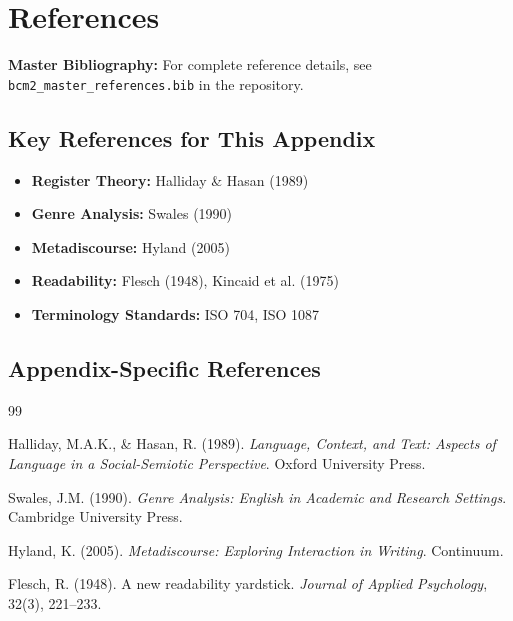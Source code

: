 \section{References}
\label{sec:doctype-references}

\begin{tcolorbox}[colback=blue!5!white, colframe=blue!75!black]
\textbf{Master Bibliography:} For complete reference details, see
\texttt{bcm2\_master\_references.bib} in the repository.
\end{tcolorbox}

\subsection{Key References for This Appendix}

\begin{itemize}[nosep]
    \item \textbf{Register Theory:} Halliday \& Hasan (1989)
    \item \textbf{Genre Analysis:} Swales (1990)
    \item \textbf{Metadiscourse:} Hyland (2005)
    \item \textbf{Readability:} Flesch (1948), Kincaid et al. (1975)
    \item \textbf{Terminology Standards:} ISO 704, ISO 1087
\end{itemize}

\subsection{Appendix-Specific References}

\begin{thebibliography}{99}

 Halliday, M.A.K., \& Hasan, R. (1989).
\textit{Language, Context, and Text: Aspects of Language in a Social-Semiotic Perspective}.
Oxford University Press.

 Swales, J.M. (1990).
\textit{Genre Analysis: English in Academic and Research Settings}.
Cambridge University Press.

 Hyland, K. (2005).
\textit{Metadiscourse: Exploring Interaction in Writing}.
Continuum.

 Flesch, R. (1948).
A new readability yardstick.
\textit{Journal of Applied Psychology}, 32(3), 221--233.

\end{thebibliography}


